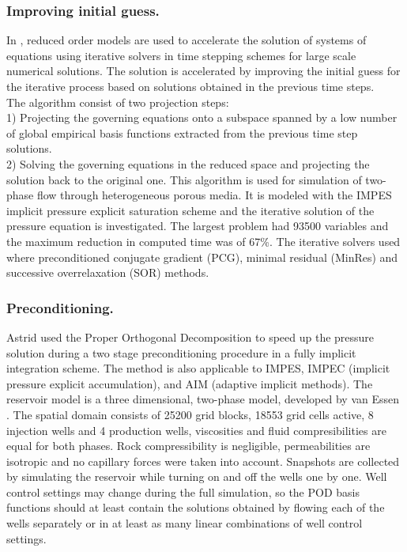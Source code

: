 \documentclass[a4paper,10pt]{report}
\begin{document}
\subsubsection{Improving initial guess.}
In \cite{Mark06}, reduced order models are used to accelerate the solution of 
systems of equations using iterative solvers in time stepping schemes for large scale numerical solutions. 
The solution is accelerated by improving the initial guess for the iterative process based on solutions obtained
in the previous time steps. \\
The algorithm consist of two projection steps:\\
1) Projecting the governing equations onto a subspace spanned by a low number of global empirical basis 
functions extracted from the previous time step solutions.\\
2) Solving the governing equations in the reduced space and projecting the solution back to the original one.
This algorithm is used for simulation of two-phase flow through heterogeneous porous media. It is modeled with the 
IMPES implicit pressure explicit saturation scheme and the iterative solution of the pressure 
equation is investigated. 
The largest problem had 93500
variables and the maximum reduction in computed time was of 67\%. 
The iterative solvers used where preconditioned conjugate gradient (PCG), minimal residual (MinRes) and 
successive overrelaxation (SOR) methods.

\subsubsection{Preconditioning.}
Astrid \cite{Astrid11} used the Proper Orthogonal Decomposition to speed up the pressure solution 
during a two stage 
preconditioning procedure in a fully implicit integration scheme. The method is also applicable to IMPES, 
IMPEC (implicit pressure explicit accumulation), and AIM (adaptive implicit methods). 
The reservoir model is a three dimensional, two-phase model, developed by van Essen \cite{vanEssen09}.
The spatial domain consists of 25200 grid blocks, 18553 grid cells active, 8 injection wells and 4 production
wells, viscosities and fluid compresibilities are equal for both phases. Rock compressibility is negligible, 
permeabilities are isotropic and no capillary forces were taken into account. 
Snapshots are collected by simulating the reservoir while turning on and off the wells one by one. 
Well control settings may change during the full simulation, so the POD basis functions should at 
least contain the solutions obtained by flowing each of the wells separately or in at least 
as many linear combinations of well control settings. \\
\end{document}

